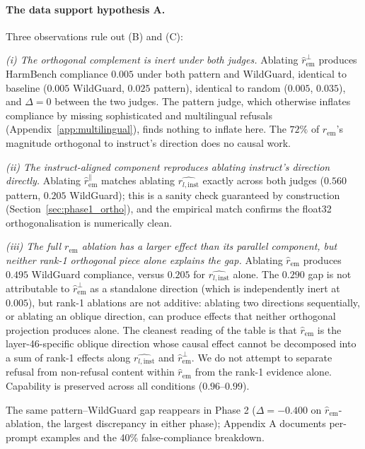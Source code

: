 \documentclass{article}
\newcommand{\rinst}{r_{l,\mathrm{inst}}}
\newcommand{\rem}{r_{\mathrm{em}}}
\begin{document}
\paragraph{The data support hypothesis A.} Three observations rule
out (B) and (C):

\emph{(i) The orthogonal complement is inert under both judges.}
Ablating $\hat{r}^{\perp}_{\mathrm{em}}$ produces HarmBench
compliance $0.005$ under both pattern and WildGuard, identical to
baseline ($0.005$ WildGuard, $0.025$ pattern), identical to random
($0.005$, $0.035$), and $\Delta = 0$ between the two judges. The
pattern judge, which otherwise inflates compliance by missing
sophisticated and multilingual refusals
(Appendix~\ref{app:multilingual}), finds nothing to inflate here.
The $72\%$ of $\rem$'s magnitude orthogonal to instruct's direction
does no causal work.

\emph{(ii) The instruct-aligned component reproduces ablating
instruct's direction directly.} Ablating
$\hat{r}^{\parallel}_{\mathrm{em}}$ matches ablating $\hat{\rinst}$
exactly across both judges ($0.560$ pattern, $0.205$ WildGuard);
this is a sanity check guaranteed by construction
(Section~\ref{sec:phase1_ortho}), and the empirical match confirms
the float32 orthogonalisation is numerically clean.

\emph{(iii) The full $\rem$ ablation has a larger effect than its
parallel component, but neither rank-1 orthogonal piece alone
explains the gap.} Ablating $\hat{r}_{\mathrm{em}}$ produces $0.495$
WildGuard compliance, versus $0.205$ for $\hat{\rinst}$ alone. The
$0.290$ gap is not attributable to $\hat{r}^{\perp}_{\mathrm{em}}$ as
a standalone direction (which is independently inert at $0.005$),
but rank-1 ablations are not additive: ablating two directions
sequentially, or ablating an oblique direction, can produce effects
that neither orthogonal projection produces alone. The cleanest
reading of the table is that $\hat{r}_{\mathrm{em}}$ is the
layer-46-specific oblique direction whose causal effect cannot be
decomposed into a sum of rank-1 effects along $\hat{\rinst}$ and
$\hat{r}^{\perp}_{\mathrm{em}}$. We do not attempt to separate
refusal from non-refusal content within $\hat{r}_{\mathrm{em}}$ from
the rank-1 evidence alone. Capability is preserved across all
conditions ($0.96$--$0.99$).

The same pattern–WildGuard gap reappears in Phase 2  ($\Delta = -0.400$
on $\hat{r}_{\mathrm{em}}$-ablation, the largest discrepancy in either phase); Appendix A documents per-prompt examples and the 40\% false-compliance breakdown.
\end{document}
